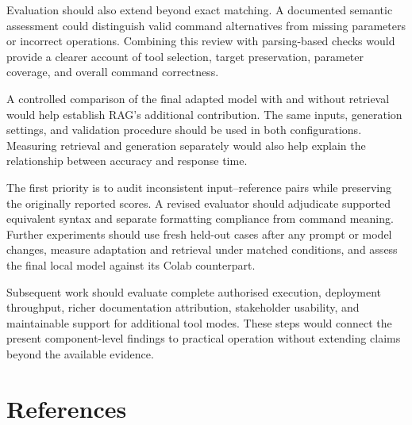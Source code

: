 \documentclass[
]{article}
\begin{document}
Evaluation should also extend beyond exact matching. A documented
semantic assessment could distinguish valid command alternatives from
missing parameters or incorrect operations. Combining this review with
parsing-based checks would provide a clearer account of tool selection,
target preservation, parameter coverage, and overall command
correctness.

A controlled comparison of the final adapted model with and without
retrieval would help establish RAG's additional contribution. The same
inputs, generation settings, and validation procedure should be used in
both configurations. Measuring retrieval and generation separately would
also help explain the relationship between accuracy and response time.

The first priority is to audit inconsistent input--reference pairs while
preserving the originally reported scores. A revised evaluator should
adjudicate supported equivalent syntax and separate formatting
compliance from command meaning. Further experiments should use fresh
held-out cases after any prompt or model changes, measure adaptation and
retrieval under matched conditions, and assess the final local model
against its Colab counterpart.

Subsequent work should evaluate complete authorised execution,
deployment throughput, richer documentation attribution, stakeholder
usability, and maintainable support for additional tool modes. These
steps would connect the present component-level findings to practical
operation without extending claims beyond the available evidence.

\hypertarget{references}{%
\section{References}\label{references}}
\end{document}
